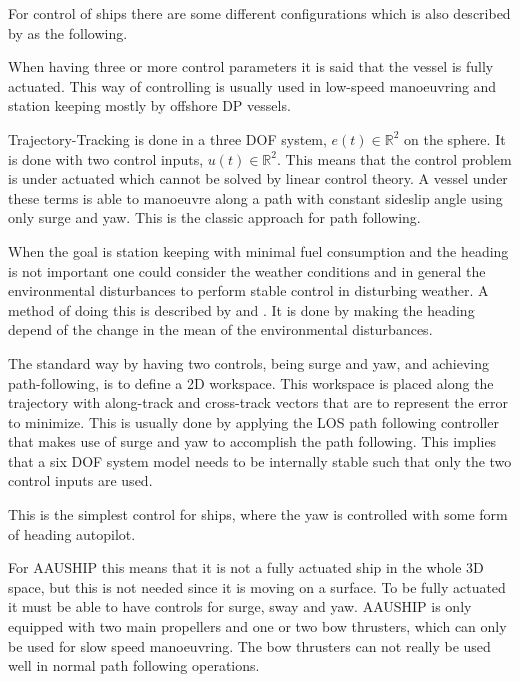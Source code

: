 For control of ships there are some different configurations which is also described by \citep{fossen} as the following.
\begin{description}[style=nextline]
	\item [Three or more controls]
	When having three or more control parameters it is said that the vessel is fully actuated. This way of controlling is usually used in low-speed manoeuvring and station keeping mostly by offshore \ac{DP} vessels.
	\item [Two controls and Trajectory-Tracking control]
	Trajectory-Tracking is done in a three \ac{DOF} system, $e(t)\in\mathds{R}^2$ on the sphere. It is done with two control inputs, $u(t)\in\mathds{R}^2$. This means that the control problem is under actuated which cannot be solved by linear control theory. A vessel under these terms is able to manoeuvre along a path with constant sideslip angle using only surge and yaw. This is the classic approach for path following.
	\item [Two controls and Weather-Optimal heading]
	When the goal is station keeping with minimal fuel consumption and the heading is not important one could consider the weather conditions and in general the environmental disturbances to perform stable control in disturbing weather. A method of doing this is described by \citep{i2001nonlinear} and \citep[sec. 13.3.10]{fossen}. It is done by making the heading depend of the change in the mean of the environmental disturbances.
	\item [Two controls and Path-Following control]
	The standard way by having two controls, being surge and yaw, and achieving path-following, is to define a 2D workspace. This workspace is placed along the trajectory with along-track and cross-track vectors that are to represent the error to minimize. This is usually done by applying the \ac{LOS} path following controller that makes use of surge and yaw to accomplish the path following. This implies that a six \ac{DOF} system model needs to be internally stable such that only the two control inputs are used.
	\item [One control]
	This is the simplest control for ships, where the yaw is controlled with some form of heading autopilot.
\end{description}


For AAUSHIP this means that it is not a fully actuated ship in the
whole 3D space, but this is not needed since it is moving on a
surface. To be fully actuated it must be able to have controls for
surge, sway and yaw. AAUSHIP is only equipped with two main propellers and 
one or two bow thrusters, which can only be used for slow speed manoeuvring.
The bow thrusters can not really be used well in normal path following operations.


